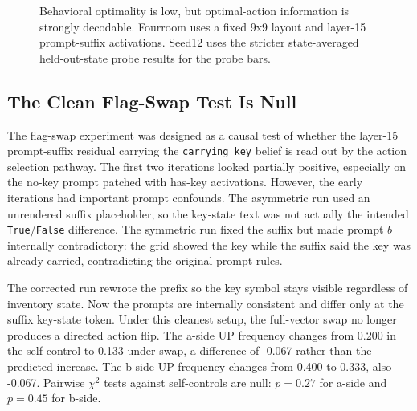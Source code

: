 \documentclass[11pt]{article}
\begin{document}
\begin{figure}[t]
\centering
{}
\caption{Behavioral optimality is low, but optimal-action information is strongly decodable. Fourroom uses a fixed 9x9 layout and layer-15 prompt-suffix activations. Seed12 uses the stricter state-averaged held-out-state probe results for the probe bars.}
\label{fig:decodability}
\end{figure}
\FloatBarrier

\subsection{The Clean Flag-Swap Test Is Null}

The flag-swap experiment was designed as a causal test of whether the layer-15 prompt-suffix residual carrying the \texttt{carrying\_key} belief is read out by the action selection pathway.
The first two iterations looked partially positive, especially on the no-key prompt patched with has-key activations.
However, the early iterations had important prompt confounds.
The asymmetric run used an unrendered suffix placeholder, so the key-state text was not actually the intended \texttt{True}/\texttt{False} difference.
The symmetric run fixed the suffix but made prompt $b$ internally contradictory: the grid showed the key while the suffix said the key was already carried, contradicting the original prompt rules.

The corrected run rewrote the prefix so the key symbol stays visible regardless of inventory state.
Now the prompts are internally consistent and differ only at the suffix key-state token.
Under this cleanest setup, the full-vector swap no longer produces a directed action flip.
The a-side UP frequency changes from 0.200 in the self-control to 0.133 under swap, a difference of -0.067 rather than the predicted increase.
The b-side UP frequency changes from 0.400 to 0.333, also -0.067.
Pairwise $\chi^2$ tests against self-controls are null: $p=0.27$ for a-side and $p=0.45$ for b-side.
\end{document}

